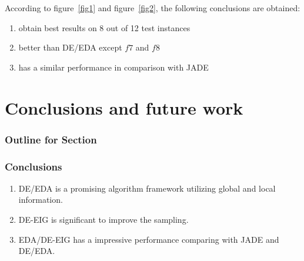 \documentclass[xcolor=dvipsnames]{beamer}
\begin{document}
    \begin{frame}
    According to figure~\ref{fig1} and figure~\ref{fig2}, the following conclusions are obtained:
    \begin{enumerate}
    \item obtain best results on 8 out of 12 test instances
    \item better than DE/EDA except $f7$ and $f8$
    \item has a similar performance in comparison with JADE
    \end{enumerate}
    
    \end{frame}

    \section{Conclusions and future work}
    \begin{frame}
      \frametitle{Outline for Section \thesection}
      \tableofcontents[currentsection]
    \end{frame}

    \begin{frame}
    \frametitle{Conclusions}
    \begin{enumerate}
    \item DE/EDA is a promising algorithm framework utilizing global and local information.
    \item DE-EIG is significant to improve the sampling.
    \item EDA/DE-EIG has a impressive performance comparing with JADE and DE/EDA.
    \end{enumerate}
%
    \end{frame}
\end{document}
